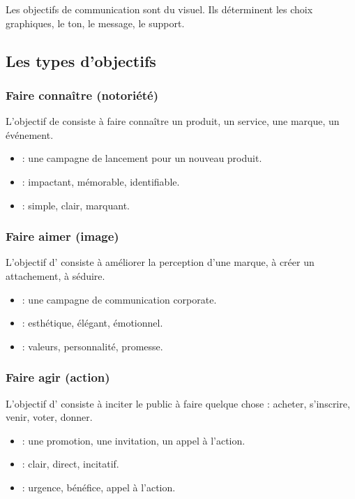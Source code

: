 Les objectifs de communication sont  du visuel. Ils déterminent les choix graphiques, le ton, le message, le support.

\subsection{Les types d'objectifs}

\subsubsection{Faire connaître (notoriété)}

L'objectif de  consiste à faire connaître un produit, un service, une marque, un événement.

\begin{itemize}
    \item {} : une campagne de lancement pour un nouveau produit.
    \item {} : impactant, mémorable, identifiable.
    \item {} : simple, clair, marquant.
\end{itemize}

\subsubsection{Faire aimer (image)}

L'objectif d' consiste à améliorer la perception d'une marque, à créer un attachement, à séduire.

\begin{itemize}
    \item {} : une campagne de communication corporate.
    \item {} : esthétique, élégant, émotionnel.
    \item {} : valeurs, personnalité, promesse.
\end{itemize}

\subsubsection{Faire agir (action)}

L'objectif d' consiste à inciter le public à faire quelque chose : acheter, s'inscrire, venir, voter, donner.

\begin{itemize}
    \item {} : une promotion, une invitation, un appel à l'action.
    \item {} : clair, direct, incitatif.
    \item {} : urgence, bénéfice, appel à l'action.
\end{itemize}

